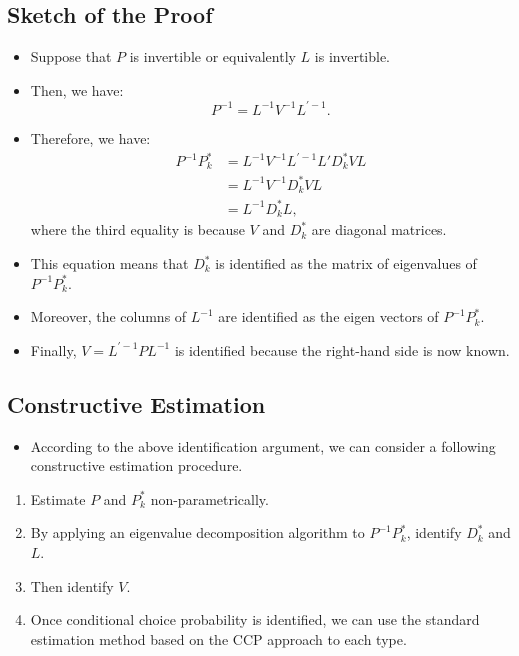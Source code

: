 \documentclass[]{book}
\providecommand{\tightlist}{%
  \setlength{\itemsep}{0pt}\setlength{\parskip}{0pt}}
\begin{document}
\subsection{Sketch of the Proof}\label{sketch-of-the-proof}

\begin{itemize}
\tightlist
\item
  Suppose that \(P\) is invertible or equivalently \(L\) is invertible.
\item
  Then, we have: \[
  P^{-1} = L^{-1}V^{-1} L^{'-1}.
  \]
\item
  Therefore, we have: \[
  \begin{split}
  P^{-1} P_k^* &= L^{-1}V^{-1} L^{'-1} L'D_k^*VL\\
  &= L^{-1} V^{-1} D_k^* V L\\
  &= L^{-1} D_k^* L,
  \end{split}
  \] where the third equality is because \(V\) and \(D_k^*\) are
  diagonal matrices.
\item
  This equation means that \(D_k^*\) is identified as the matrix of
  eigenvalues of \(P^{-1} P_k^*\).
\item
  Moreover, the columns of \(L^{-1}\) are identified as the eigen
  vectors of \(P^{-1} P_k^*\).
\item
  Finally, \(V = L^{'-1} P L^{-1}\) is identified because the right-hand
  side is now known.
\end{itemize}

\subsection{Constructive Estimation}\label{constructive-estimation}

\begin{itemize}
\tightlist
\item
  According to the above identification argument, we can consider a
  following constructive estimation procedure.
\end{itemize}

\begin{enumerate}
\def\labelenumi{\arabic{enumi}.}
\tightlist
\item
  Estimate \(P\) and \(P_k^*\) non-parametrically.
\item
  By applying an eigenvalue decomposition algorithm to \(P^{-1} P_k^*\),
  identify \(D_k^*\) and \(L\).
\item
  Then identify \(V\).
\item
  Once conditional choice probability is identified, we can use the
  standard estimation method based on the CCP approach to each type.
\end{enumerate}
\end{document}
